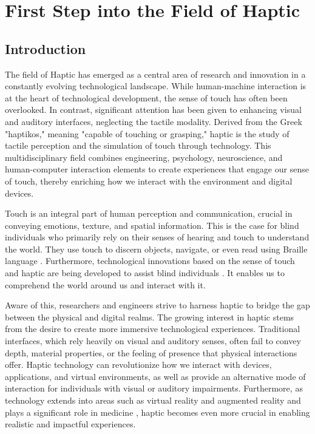 \chapter{First Step into the Field of Haptic}
\section{Introduction}
The field of Haptic has emerged as a central area of research and innovation in a constantly evolving technological landscape. While human-machine interaction is at the heart of technological development, the sense of touch has often been overlooked. In contrast, significant attention has been given to enhancing visual and auditory interfaces, neglecting the tactile modality. Derived from the Greek "haptikos," meaning "capable of touching or grasping," haptic is the study of tactile perception and the simulation of touch through technology. This multidisciplinary field combines engineering, psychology, neuroscience, and human-computer interaction elements to create experiences that engage our sense of touch, thereby enriching how we interact with the environment and digital devices.

Touch is an integral part of human perception and communication, crucial in conveying emotions, texture, and spatial information. This is the case for blind individuals who primarily rely on their senses of hearing and touch to understand the world. They use touch to discern objects, navigate, or even read using Braille language \cite{jimenez_biography_2009}. Furthermore, technological innovations based on the sense of touch and haptic are being developed to assist blind individuals \cite{ramstein_combining_1996}\cite{noauthor_brailleband_nodate}. It enables us to comprehend the world around us and interact with it.

Aware of this, researchers and engineers strive to harness haptic to bridge the gap between the physical and digital realms.
The growing interest in haptic stems from the desire to create more immersive technological experiences. Traditional interfaces, which rely heavily on visual and auditory senses, often fail to convey depth, material properties, or the feeling of presence that physical interactions offer. Haptic technology can revolutionize how we interact with devices, applications, and virtual environments, as well as provide an alternative mode of interaction for individuals with visual or auditory impairments. Furthermore, as technology extends into areas such as virtual reality and augmented reality and plays a significant role in medicine \cite{escobar-castillejos_review_2016}, haptic becomes even more crucial in enabling realistic and impactful experiences.

